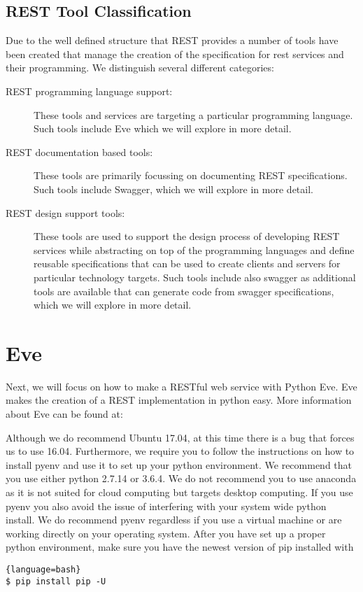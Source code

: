  
\subsection{REST Tool Classification}

Due to the well defined structure that REST provides a number of tools
have been created that manage the creation of the specification for
rest services and their programming. We distinguish several different
categories:

\begin{description}
\item[REST programming language support:] These tools and services are
targeting a particular programming language. Such tools include Eve
which we will explore in more detail.

\item[REST documentation based tools:] These tools are primarily
  focussing on documenting REST specifications. Such tools include
  Swagger, which we will explore in more detail.

\item[REST design support tools:] These tools are used to support the
  design process of developing REST services while abstracting on top
  of the programming languages and define reusable specifications that
  can be used to create clients and servers for particular technology
  targets. Such tools include also swagger as additional tools are
  available that can generate code from swagger specifications, which
  we will explore in more detail.
\end{description}

\section{Eve}\label{s:eve-intro}

Next, we will focus on how to make a RESTful web service with Python
Eve. Eve makes the creation of a REST implementation in python
easy. More information about Eve can be found at:


\begin{WARNING}

Although we do recommend Ubuntu 17.04, at this time there is a bug
that forces us to use 16.04. Furthermore, we require you to follow the
instructions on how to install pyenv and use it to set up your python
environment. We recommend that you use either python 2.7.14 or 3.6.4.
We do not recommend you to use anaconda as it is not suited for cloud
computing but targets desktop computing. If you use pyenv you also
avoid the issue of interfering with your system wide python
install. We do recommend pyenv regardless if you use a virtual machine
or are working directly on your operating system. After you have set
up a proper python environment, make sure you have the newest version
of pip installed with 

\smallskip

\begin{lstlisting}{language=bash}
$ pip install pip -U
\end{lstlisting}
\end{WARNING}

